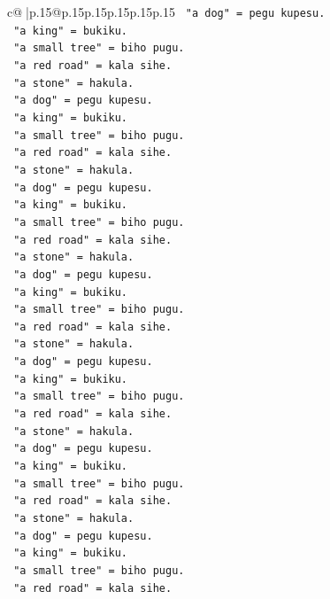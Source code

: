\documentclass{article}
\begin{document}
{\begin{supertabular}{c@{$\;$}|p{.15\linewidth}@{}p{.15\linewidth}p{.15\linewidth}p{.15\linewidth}p{.15\linewidth}p{.15\linewidth}}
{{{\texttt{   "a dog" = pegu kupesu.} \\
\texttt{   "a king" = bukiku.} \\
\texttt{   "a small tree" = biho pugu.} \\
\texttt{   "a red road" = kala sihe.} \\
\texttt{   "a stone" = hakula.} \\
\texttt{   "a dog" = pegu kupesu.} \\
\texttt{   "a king" = bukiku.} \\
\texttt{   "a small tree" = biho pugu.} \\
\texttt{   "a red road" = kala sihe.} \\
\texttt{   "a stone" = hakula.} \\
\texttt{   "a dog" = pegu kupesu.} \\
\texttt{   "a king" = bukiku.} \\
\texttt{   "a small tree" = biho pugu.} \\
\texttt{   "a red road" = kala sihe.} \\
\texttt{   "a stone" = hakula.} \\
\texttt{   "a dog" = pegu kupesu.} \\
\texttt{   "a king" = bukiku.} \\
\texttt{   "a small tree" = biho pugu.} \\
\texttt{   "a red road" = kala sihe.} \\
\texttt{   "a stone" = hakula.} \\
\texttt{   "a dog" = pegu kupesu.} \\
\texttt{   "a king" = bukiku.} \\
\texttt{   "a small tree" = biho pugu.} \\
\texttt{   "a red road" = kala sihe.} \\
\texttt{   "a stone" = hakula.} \\
\texttt{   "a dog" = pegu kupesu.} \\
\texttt{   "a king" = bukiku.} \\
\texttt{   "a small tree" = biho pugu.} \\
\texttt{   "a red road" = kala sihe.} \\
\texttt{   "a stone" = hakula.} \\
\texttt{   "a dog" = pegu kupesu.} \\
\texttt{   "a king" = bukiku.} \\
\texttt{   "a small tree" = biho pugu.} \\
\texttt{   "a red road" = kala sihe.} \\
}}}
\end{supertabular}}
\end{document}
